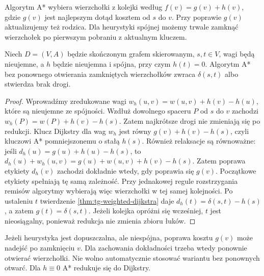 Algorytm A* wybiera wierzchołki
z kolejki według
$f(v)=g(v)+h(v)$, gdzie
$g(v)$ jest najlepszym dotąd
kosztem od $s$ do $v$.
Przy poprawie $g(v)$
aktualizujemy też rodzica.
Dla heurystyki spójnej
możemy trwale zamknąć
wierzchołek po pierwszym
pobraniu z aktualnym kluczem.

\begin{twierdzenie}[Poprawność A*]
\label{thm:tg-weighted-astar}
Niech $D=(V,A)$ będzie skończonym grafem skierowanym,
$s,t\in V$, wagi będą nieujemne, a $h$
będzie nieujemna i spójna,
przy czym $h(t)=0$.
Algorytm A* bez ponownego
otwierania zamkniętych
wierzchołków zwraca
$\delta(s,t)$ albo
stwierdza brak drogi.
\end{twierdzenie}
\begin{proof}
Wprowadźmy zredukowane
wagi $w_h(u,v)=w(u,v)+h(v)-h(u)$,
które są nieujemne ze spójności.
Wzdłuż dowolnego spaceru
$P$ od $s$ do $v$ zachodzi
$w_h(P)=w(P)+h(v)-h(s)$.
Zatem najkrótsze drogi nie
zmieniają się po redukcji.
Klucz Dijkstry dla wag
$w_h$ jest równy
$g(v)+h(v)-h(s)$,
czyli kluczowi A*
pomniejszonemu o stałą $h(s)$.
Również relaksacje są równoważne: jeśli
$d_h(u)=g(u)+h(u)-h(s)$, to
$d_h(u)+w_h(u,v)=g(u)+w(u,v)+h(v)-h(s)$.
Zatem poprawa etykiety $d_h(v)$ zachodzi dokładnie
wtedy, gdy poprawia się $g(v)$. Początkowe etykiety
spełniają tę samą zależność. Przy jednakowej regule
rozstrzygania remisów algorytmy wybierają więc
wierzchołki w tej samej kolejności. Po ustaleniu $t$
twierdzenie \ref{thm:tg-weighted-dijkstra} daje
$d_h(t)=\delta(s,t)-h(s)$, a zatem $g(t)=\delta(s,t)$.
Jeżeli kolejka opróżni się wcześniej, $t$ jest nieosiągalny,
ponieważ redukcja nie zmienia zbioru łuków.
\end{proof}

\begin{uwaga}
Jeżeli heurystyka jest
dopuszczalna, ale niespójna,
poprawa kosztu $g(v)$
może nadejść po zamknięciu $v$.
Dla zachowania dokładności
trzeba wtedy ponownie
otwierać wierzchołki.
Nie wolno automatycznie
stosować wariantu
bez ponownych otwarć.
Dla $h\equiv0$ A*
redukuje się do Dijkstry.
\end{uwaga}

